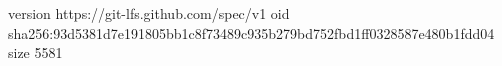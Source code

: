 version https://git-lfs.github.com/spec/v1
oid sha256:93d5381d7e191805bb1c8f73489c935b279bd752fbd1ff0328587e480b1fdd04
size 5581

